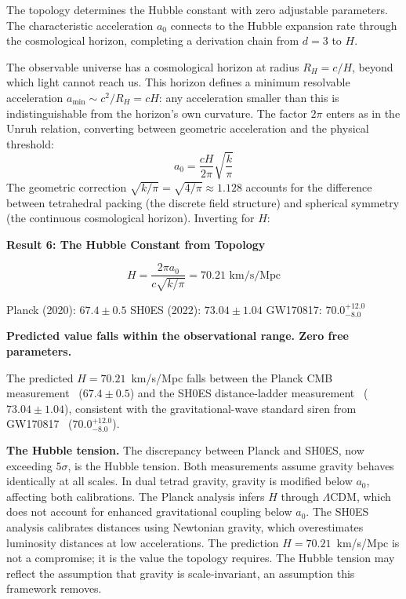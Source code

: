 \documentclass[aps,prd,preprint,superscriptaddress,showpacs,preprintnumbers,amsmath,amssymb,nofootinbib]{revtex4-2}
\begin{document}
The topology determines the Hubble constant with zero adjustable parameters. The characteristic acceleration $a_0$ connects to the Hubble expansion rate through the cosmological horizon, completing a derivation chain from $d = 3$ to $H$.

The observable universe has a cosmological horizon at radius $R_H = c/H$, beyond which light cannot reach us. This horizon defines a minimum resolvable acceleration $a_{\min} \sim c^2/R_H = cH$: any acceleration smaller than this is indistinguishable from the horizon's own curvature. The factor $2\pi$ enters as in the Unruh relation, converting between geometric acceleration and the physical threshold:
\begin{equation}
a_0 = \frac{cH}{2\pi} \sqrt{\frac{k}{\pi}}
\label{eq:cosmo-connect}
\end{equation}
The geometric correction $\sqrt{k/\pi} = \sqrt{4/\pi} \approx 1.128$ accounts for the difference between tetrahedral packing (the discrete field structure) and spherical symmetry (the continuous cosmological horizon). Inverting for $H$:

\vspace{1em}
\noindent
\colorbox{resultgreen}{\parbox{\dimexpr\textwidth-2\fboxsep\relax}{%
\vspace{0.8em}
\centering
\textbf{\large Result 6: The Hubble Constant from Topology}

\vspace{0.5em}
\boldmath
\begin{equation}
H = \frac{2\pi a_0}{c\sqrt{k/\pi}} = 70.21 \text{ km/s/Mpc}
\label{eq:hubble-result}
\end{equation}
\unboldmath

\vspace{0.3em}
Planck (2020): $\bm{67.4 \pm 0.5}$ \quad SH0ES (2022): $\bm{73.04 \pm 1.04}$ \quad GW170817: $\bm{70.0^{+12.0}_{-8.0}}$

\textbf{Predicted value falls within the observational range. Zero free parameters.}
\vspace{0.5em}
}}
\vspace{1em}

The predicted $H = 70.21$~km/s/Mpc falls between the Planck CMB measurement~\cite{planck2020} ($67.4 \pm 0.5$) and the SH0ES distance-ladder measurement~\cite{riess2022} ($73.04 \pm 1.04$), consistent with the gravitational-wave standard siren from GW170817~\cite{gw170817} ($70.0^{+12.0}_{-8.0}$).

\textbf{The Hubble tension.} The discrepancy between Planck and SH0ES, now exceeding $5\sigma$, is the Hubble tension. Both measurements assume gravity behaves identically at all scales. In dual tetrad gravity, gravity is modified below $a_0$, affecting both calibrations. The Planck analysis infers $H$ through $\Lambda$CDM, which does not account for enhanced gravitational coupling below $a_0$. The SH0ES analysis calibrates distances using Newtonian gravity, which overestimates luminosity distances at low accelerations. The prediction $H = 70.21$~km/s/Mpc is not a compromise; it is the value the topology requires. The Hubble tension may reflect the assumption that gravity is scale-invariant, an assumption this framework removes.
\end{document}
